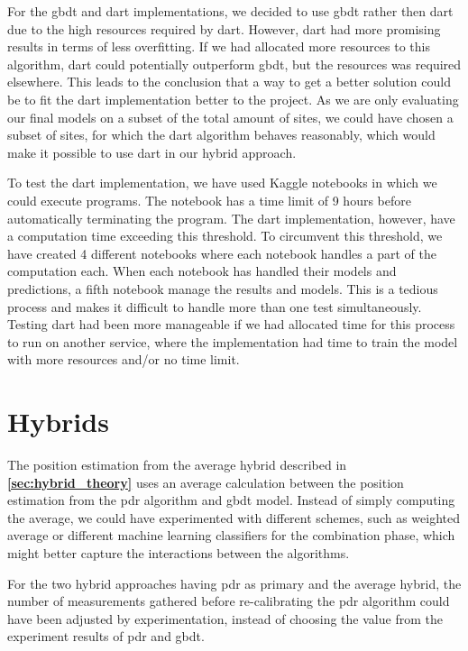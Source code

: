 For the \gls{gbdt} and \gls{dart} implementations, we decided to use \gls{gbdt} rather then \gls{dart} due to the high resources required by \gls{dart}. However, \gls{dart} had more promising results in terms of less overfitting. If we had allocated more resources to this algorithm, \gls{dart} could potentially outperform \gls{gbdt}, but the resources was required elsewhere. This leads to the conclusion that a way to get a better solution could be to fit the \gls{dart} implementation better to the project. As we are only evaluating our final models on a subset of the total amount of sites, we could have chosen a subset of sites, for which the \gls{dart} algorithm behaves reasonably, which would make it possible to use \gls{dart} in our hybrid approach. %

To test the \gls{dart} implementation, we have used Kaggle notebooks in which we could execute programs. The notebook has a time limit of 9 hours before automatically terminating the program. The \gls{dart} implementation, however, have a computation time exceeding this threshold. To circumvent this threshold, we have created 4 different notebooks where each notebook handles a part of the computation each. When each notebook has handled their models and predictions, a fifth notebook manage the results and models. This is a tedious process and makes it difficult to handle more than one test simultaneously. Testing \gls{dart} had been more manageable if we had allocated time for this process to run on another service, where the implementation had time to train the model with more resources and/or no time limit.

\section{Hybrids}
The position estimation from the average hybrid described in \textbf{\autoref{sec:hybrid_theory}} uses an average calculation between the position estimation from the \gls{pdr} algorithm and \gls{gbdt} model. Instead of simply computing the average, we could have experimented with different schemes, such as weighted average or different machine learning classifiers for the combination phase, which might better capture the interactions between the algorithms.

For the two hybrid approaches having \gls{pdr} as primary and the average hybrid, the number of measurements gathered before re-calibrating the \gls{pdr} algorithm could have been adjusted by experimentation, instead of choosing the value from the experiment results of \gls{pdr} and \gls{gbdt}.

